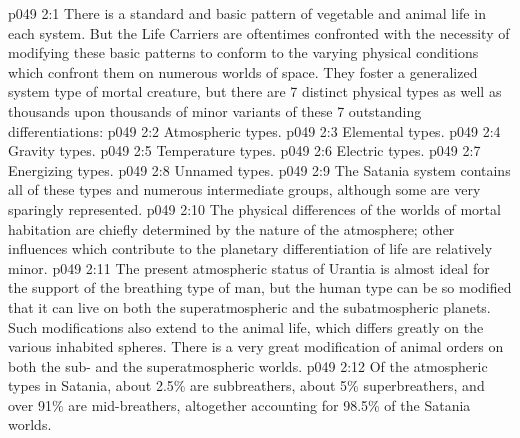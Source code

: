 \vs p049 2:1 There is a standard and basic pattern of vegetable and animal life in each system. But the Life Carriers are oftentimes confronted with the necessity of modifying these basic patterns to conform to the varying physical conditions which confront them on numerous worlds of space. They foster a generalized system type of mortal creature, but there are 7 distinct physical types as well as thousands upon thousands of minor variants of these 7 outstanding differentiations:
\vs p049 2:2 \bibnobreakspace Atmospheric types.
\vs p049 2:3 \bibnobreakspace Elemental types.
\vs p049 2:4 \bibnobreakspace Gravity types.
\vs p049 2:5 \bibnobreakspace Temperature types.
\vs p049 2:6 \bibnobreakspace Electric types.
\vs p049 2:7 \bibnobreakspace Energizing types.
\vs p049 2:8 \bibnobreakspace Unnamed types.
\vs p049 2:9 \pc The Satania system contains all of these types and numerous intermediate groups, although some are very sparingly represented.
\vs p049 2:10 \bibnobreakspace {} The physical differences of the worlds of mortal habitation are chiefly determined by the nature of the atmosphere; other influences which contribute to the planetary differentiation of life are relatively minor.
\vs p049 2:11 The present atmospheric status of Urantia is almost ideal for the support of the breathing type of man, but the human type can be so modified that it can live on both the superatmospheric and the subatmospheric planets. Such modifications also extend to the animal life, which differs greatly on the various inhabited spheres. There is a very great modification of animal orders on both the sub\hyp{} and the superatmospheric worlds.
\vs p049 2:12 Of the atmospheric types in Satania, about 2.5\% are subbreathers, about 5\% superbreathers, and over 91\% are mid\hyp{}breathers, altogether accounting for 98.5\% of the Satania worlds.
